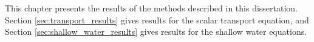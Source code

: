 This chapter presents the results of the methods described in this
dissertation. Section \ref{sec:transport_results} gives results for the
scalar transport equation, and Section \ref{sec:shallow_water_results}
gives results for the shallow water equations.
